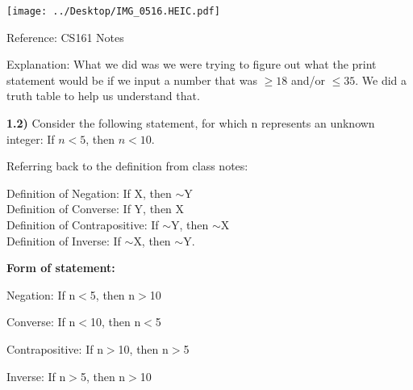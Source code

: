 \documentclass{article}
\begin{document}
\texttt{[image: ../Desktop/IMG\_0516.HEIC.pdf]}


Reference: CS161 Notes


\vspace{3mm}

Explanation: What we did was we were trying to figure out what the print statement would be if we input a number that was 
$\ge18$ and/or $\le35$. We did a truth table to help us understand that. 

\newpage


\textbf{1.2)}  Consider the following statement, for which n represents an unknown integer: If $n<5$, then $n<10.$

\vspace{3mm}

Referring back to the definition from class notes:

\vspace{3mm}

\begin{center}
Definition of Negation: If X, then $\sim$Y\\

\hspace{.09mm}Definition of Converse: If Y, then X\\


\hspace{.4in} Definition of Contrapositive: If $\sim$Y, then $\sim$X\\


Definition of Inverse: If $\sim$X, then $\sim$Y. 

\end{center}

\vspace{3mm}


\textbf{Form of statement:}
\vspace{3mm}


Negation: If n$<$5, then n$>$10

\vspace{2mm}

Converse: If n$<$10, then n$<$5

\vspace{2mm}

Contrapositive: If n$>$10, then n$>$5

\vspace{2mm}

Inverse: If n$>$5, then n$>$10

\vspace{3mm} 
\end{document}
